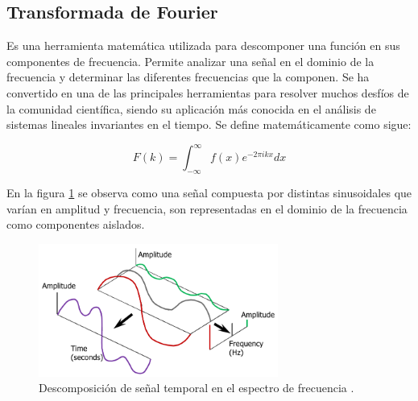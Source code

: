 \subsection{Transformada de Fourier}
Es una herramienta matemática utilizada para descomponer una función en sus componentes de frecuencia. Permite analizar una señal en el dominio de la frecuencia y determinar las diferentes frecuencias que la componen. Se ha convertido en una de las principales herramientas para resolver muchos desfíos de la comunidad científica, siendo su aplicación más conocida en el análisis de sistemas lineales invariantes en el tiempo. Se define matemáticamente como sigue:

\begin{equation}
    F(k) = \int_{-\infty}^{\infty} f(x) e^{-2\pi i k x} dx
\end{equation}

En la figura \ref{fig:fourier} se observa como una señal compuesta por distintas sinusoidales que varían en amplitud y frecuencia, son representadas en el dominio de la frecuencia como componentes aislados. 

\begin{figure}[H]
    \centering
    \includegraphics[width = 0.7\textwidth]{imagenes/cap1_marcoteo/FourierTRansform.png}
    \caption{Descomposición de señal temporal en el espectro de frecuencia \citep{siemens2019}.}
    \label{fig:fourier}
\end{figure}


